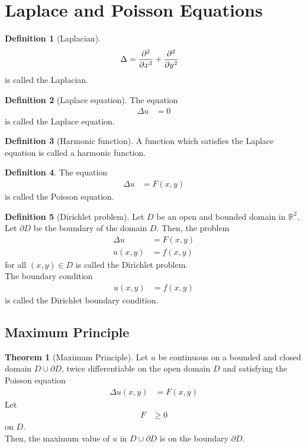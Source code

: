 \documentclass[titlepage, fleqn, a4paper, 12pt, twoside]{article}
\theoremstyle{definition}
\newtheorem{definition}{Definition}
\theoremstyle{theorem}
\newtheorem{theorem}{Theorem}
\begin{document}
\section{Laplace and Poisson Equations}

\begin{definition}[Laplacian]
	\begin{align*}
		\Delta & = \dpd[2]{}{x} + \dpd[2]{}{y}
	\end{align*}
	is called the Laplacian.
\end{definition}

\begin{definition}[Laplace equation]
	The equation
	\begin{align*}
		\Delta u & = 0
	\end{align*}
	is called the Laplace equation.
\end{definition}

\begin{definition}[Harmonic function]
	A function which satisfies the Laplace equation is called a harmonic function.
\end{definition}

\begin{definition}
	The equation
	\begin{align*}
		\Delta u & = F(x,y)
	\end{align*}
	is called the Poisson equation.
\end{definition}

\begin{definition}[Dirichlet problem]
	Let $D$ be an open and bounded domain in $\mathbb{R}^2$.
	Let $\partial D$ be the boundary of the domain $D$.
	Then, the problem
	\begin{align*}
		\Delta u & = F(x,y) \\
		u(x,y)   & = f(x,y)
	\end{align*}
	for all $(x,y) \in D$ is called the Dirichlet problem.\\
	The boundary condition
	\begin{align*}
		u(x,y) & = f(x,y)
	\end{align*}
	is called the Dirichlet boundary condition.
\end{definition}

\subsection{Maximum Principle}

\begin{theorem}[Maximum Principle]
	Let $u$ be continuous on a bounded and closed domain $D \cup \partial D$, twice differentiable on the open domain $D$ and satisfying the Poisson equation
	\begin{align*}
		\Delta u(x,y) & = F(x,y)
	\end{align*}
	Let
	\begin{align*}
		F & \ge 0
	\end{align*}
	on $D$.\\
	Then, the maximum value of $u$ in $D \cup \partial D$ is on the boundary $\partial D$.
	\label{thm:Maximum_Principle}
\end{theorem}
\end{document}
